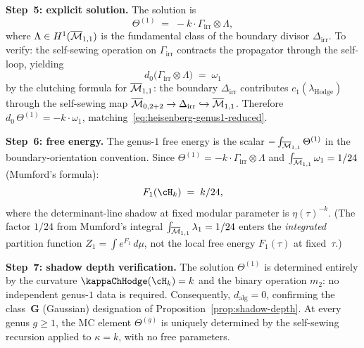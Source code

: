 \begin{computation}
\smallskip
\noindent
\textbf{Step~5: explicit solution.}
The solution is
\begin{equation}\label{eq:heisenberg-theta1}
\Theta^{(1)}
\;=\;
-k \cdot \Gamma_{\mathrm{irr}} \otimes \Lambda,
\end{equation}
where
$\Lambda \in H^1(\overline{\mathcal{M}}_{1,1})$ is the fundamental class
of the boundary divisor $\Delta_{\mathrm{irr}}$. To verify:
the self-sewing operation on $\Gamma_{\mathrm{irr}}$ contracts
the propagator through the self-loop, yielding
\[
d_0\!\bigl(\Gamma_{\mathrm{irr}} \otimes \Lambda\bigr)
\;=\;
\omega_1
\]
by the clutching formula for $\overline{\mathcal{M}}_{1,1}$: the boundary
$\Delta_{\mathrm{irr}}$ contributes
$c_1(\lambda_{\mathrm{Hodge}})$ through the self-sewing map
$\overline{\mathcal{M}}_{0,2+2} \to \Delta_{\mathrm{irr}} \hookrightarrow
\overline{\mathcal{M}}_{1,1}$. Therefore
$d_0\,\Theta^{(1)} = -k \cdot \omega_1$,
matching~\eqref{eq:heisenberg-genus1-reduced}.

\smallskip
\noindent
\textbf{Step~6: free energy.}
The genus-$1$ free energy is the scalar
$-\int_{\overline{\mathcal{M}}_{1,1}}\Theta^{(1)}$ in the boundary-orientation
convention. Since
$\Theta^{(1)} = -k \cdot \Gamma_{\mathrm{irr}} \otimes \Lambda$
and $\int_{\overline{\mathcal{M}}_{1,1}} \omega_1 = 1/24$ (Mumford's formula):
\begin{equation}\label{eq:heisenberg-F1}
F_1(\cH_k)
\;=\;
k/24,
\end{equation}
where the determinant-line shadow at fixed modular parameter is
$\eta(\tau)^{-k}$.
(The factor $1/24$ from Mumford's integral
$\int_{\overline{\mathcal{M}}_{1,1}} \lambda_1 = 1/24$ enters the
\emph{integrated} partition function
$Z_1 = \int e^{F_1}\,d\mu$, not the local free
energy $F_1(\tau)$ at fixed~$\tau$.)

\smallskip
\noindent
\textbf{Step~7: shadow depth verification.}
The solution $\Theta^{(1)}$ is determined entirely by the
curvature $\kappaChHodge(\cH_k) = k$ and the binary operation $m_2$:
no independent genus-$1$ data is required. Consequently,
$d_{\mathrm{alg}} = 0$, confirming the class~$\mathbf{G}$
(Gaussian) designation of
Proposition~\ref{prop:shadow-depth}. At every genus
$g \ge 1$, the MC element $\Theta^{(g)}$ is uniquely determined
by the self-sewing recursion applied to $\kappa = k$, with no
free parameters.
\end{computation}

